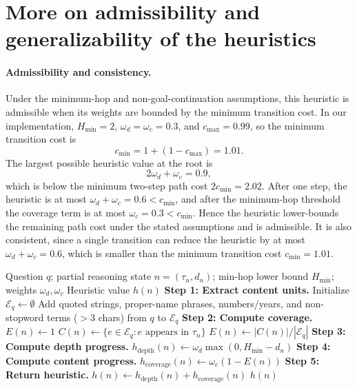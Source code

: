 \documentclass{article}
\makeatletter
\def\AND{\@endauthor\rm\hss \vskip \interauthorskip \@startauthor}
\makeatother
\begin{document}




\section{More on admissibility and generalizability of the heuristics}\label{more-on}

\paragraph{Admissibility and consistency.}
Under the minimum-hop and non-goal-continuation assumptions, this
heuristic is admissible when its weights are bounded by the minimum
transition cost. In our implementation, \(H_{\min}=2\),
\(\omega_d=\omega_c=0.3\), and \(c_{\max}=0.99\), so the minimum
transition cost is
\[
c_{\min}=1+(1-c_{\max})=1.01.
\]
The largest possible heuristic value at the root is
\[
2\omega_d+\omega_c=0.9,
\]
which is below the minimum two-step path cost \(2c_{\min}=2.02\). After
one step, the heuristic is at most \(\omega_d+\omega_c=0.6<c_{\min}\),
and after the minimum-hop threshold the coverage term is at most
\(\omega_c=0.3<c_{\min}\). Hence the heuristic lower-bounds the remaining
path cost under the stated assumptions and is admissible. It is also
consistent, since a single transition can reduce the heuristic by at most
\(\omega_d+\omega_c=0.6\), which is smaller than the minimum transition
cost \(c_{\min}=1.01\).

\begin{algorithm}[t]
\caption{Dataset-Agnostic Symbolic Progress Heuristic}
\label{alg:symbolic-progress-heuristic}
\let\AND\relax\begin{algorithmic}[1]
\REQUIRE Question $q$; partial reasoning state $n=(\tau_n,d_n)$;
         min-hop lower bound $H_{\min}$; weights $\omega_d,\omega_c$
\ENSURE Heuristic value $h(n)$
\STATE \textbf{Step 1: Extract content units.}
\STATE Initialize $\mathcal{E}_q \leftarrow \emptyset$
\STATE Add quoted strings, proper-name phrases, numbers/years, and non-stopword terms ($>$3 chars) from $q$ to $\mathcal{E}_q$
\STATE \textbf{Step 2: Compute coverage.}
    \STATE $E(n) \leftarrow 1$
\ELSE
    \STATE $C(n) \leftarrow \{e \in \mathcal{E}_q : e \text{ appears in } \tau_n\}$
    \STATE $E(n) \leftarrow |C(n)| / |\mathcal{E}_q|$
\ENDIF
\STATE \textbf{Step 3: Compute depth progress.}
\STATE $h_{\mathrm{depth}}(n) \leftarrow \omega_d \max(0, H_{\min} - d_n)$
\STATE \textbf{Step 4: Compute content progress.}
\STATE $h_{\mathrm{coverage}}(n) \leftarrow \omega_c (1 - E(n))$
\STATE \textbf{Step 5: Return heuristic.}
\STATE $h(n) \leftarrow h_{\mathrm{depth}}(n) + h_{\mathrm{coverage}}(n)$
\RETURN $h(n)$
\end{algorithmic}
\end{algorithm}
\end{document}
